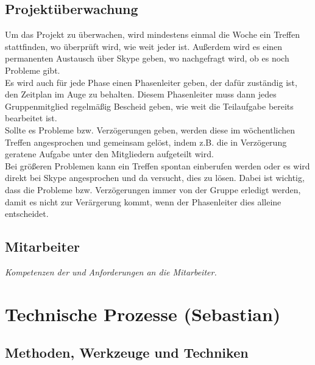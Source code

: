 \documentclass[fontsize=12pt,paper=a4,twoside]{scrartcl}
\begin{document}
\subsection{Projektüberwachung}\label{3.4-controlling}

Um das Projekt zu überwachen, wird mindestens einmal die Woche ein Treffen stattfinden, wo überprüft wird, wie weit jeder ist. Außerdem wird es einen permanenten Austausch über Skype geben, wo nachgefragt wird, ob es noch Probleme gibt. \\
Es wird auch für jede Phase einen Phasenleiter geben, der dafür zuständig ist, den Zeitplan im Auge zu behalten. Diesem Phasenleiter muss dann jedes Gruppenmitglied regelmäßig Bescheid geben, wie weit die Teilaufgabe bereits bearbeitet ist.\\
Sollte es Probleme bzw. Verzögerungen geben, werden diese im wöchentlichen Treffen angesprochen und gemeinsam gelöst, indem z.B. die in Verzögerung geratene Aufgabe unter den Mitgliedern aufgeteilt wird.\\
Bei größeren Problemen kann ein Treffen spontan einberufen werden oder es wird direkt bei Skype angesprochen und da versucht, dies zu lösen. Dabei ist wichtig, dass die Probleme bzw. Verzögerungen immer von der Gruppe erledigt werden, damit es nicht zur Verärgerung kommt, wenn der Phasenleiter dies alleine entscheidet.

\subsection{Mitarbeiter}
{\em Kompetenzen der und Anforderungen an die Mitarbeiter.}


\section{Technische Prozesse (Sebastian)}
\subsection{Methoden, Werkzeuge und Techniken}
\end{document}
